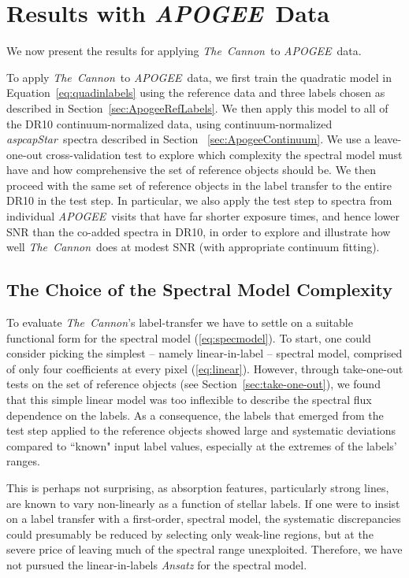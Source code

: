 \documentclass[12pt, preprint]{aastex}
\newcommand{\sectionname}{Section}
\newcommand{\tc}{\textsl{The~Cannon}}
\newcommand{\apogee}{\textsl{APOGEE}}
\newcommand{\aspcapstar}{\textsl{aspcapStar}}
\begin{document}
\section{Results with \apogee\ Data}
\label{sec:results}


We now present the results for applying \tc\ to \apogee\ data. 

To apply \tc\ to \apogee\ data, we first train the quadratic model in Equation~\ref{eq:quadinlabels} using the reference data and three labels chosen as described in Section~\ref{sec:ApogeeRefLabels}. We then apply this model to all of the DR10 continuum-normalized data, using continuum-normalized \aspcapstar\ spectra described in Section~ \ref{sec:ApogeeContinuum}. We use a leave-one-out cross-validation test to explore which complexity the spectral model must have and how comprehensive the set of reference objects should be. We then proceed with the same set of reference objects in the label transfer to the entire DR10 in the test step. In particular, we also apply the test step to spectra from individual \apogee\ visits that have far shorter exposure times, and hence lower SNR than the co-added spectra in DR10, in order to explore and illustrate how well \tc\ does at modest SNR (with appropriate continuum fitting).


\subsection{The Choice of the Spectral Model Complexity}
\label{sec:ModelComplexity} 

To evaluate \tc 's label-transfer we have to settle on a suitable functional form for the spectral model (\ref{eq:specmodel}).
To start, one could consider picking the simplest -- namely linear-in-label -- spectral model, comprised of only four coefficients at every pixel (\ref{eq:linear}).
However, through take-one-out tests on the set of reference objects (see \sectionname~\ref{sec:take-one-out}), we found that this simple linear model was too inflexible to describe the spectral flux dependence on the labels.
As a consequence, the labels that emerged from the test step applied to the reference objects showed large and systematic deviations compared to ``known" input label values,
especially at the extremes of the labels' ranges. 

This is perhaps not surprising, as absorption features, particularly strong lines, are known to vary non-linearly as a function of stellar labels. If one were to insist on a label transfer with a first-order, spectral model, the systematic discrepancies could presumably be reduced by selecting only weak-line regions, but at the severe price of leaving much of the spectral range unexploited. Therefore, we have not pursued the linear-in-labels \textit{Ansatz} for the spectral model.
\end{document}
